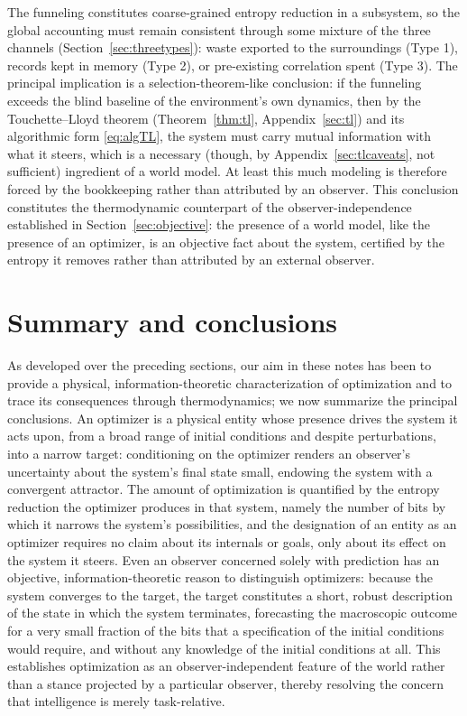 \documentclass[10pt]{article}
\theoremstyle{definition}
\theoremstyle{remark}
\begin{document}
The funneling constitutes coarse-grained entropy reduction in a subsystem, so the global accounting must remain consistent through some mixture of the three channels (Section~\ref{sec:threetypes}): waste exported to the surroundings (Type 1), records kept in memory (Type 2), or pre-existing correlation spent (Type 3). The principal implication is a selection-theorem-like conclusion: if the funneling exceeds the blind baseline of the environment's own dynamics, then by the Touchette--Lloyd theorem (Theorem~\ref{thm:tl}, Appendix~\ref{sec:tl}) and its algorithmic form \eqref{eq:algTL}, the system must carry mutual information with what it steers, which is a necessary (though, by Appendix~\ref{sec:tlcaveats}, not sufficient) ingredient of a world model. At least this much modeling is therefore forced by the bookkeeping rather than attributed by an observer. This conclusion constitutes the thermodynamic counterpart of the observer-independence established in Section~\ref{sec:objective}: the presence of a world model, like the presence of an optimizer, is an objective fact about the system, certified by the entropy it removes rather than attributed by an external observer.
\section{Summary and conclusions}
\label{sec:takeaways}

As developed over the preceding sections, our aim in these notes has been to provide a physical, information-theoretic characterization of optimization and to trace its consequences through thermodynamics; we now summarize the principal conclusions. An optimizer is a physical entity whose presence drives the system it acts upon, from a broad range of initial conditions and despite perturbations, into a narrow target: conditioning on the optimizer renders an observer's uncertainty about the system's final state small, endowing the system with a convergent attractor. The amount of optimization is quantified by the entropy reduction the optimizer produces in that system, namely the number of bits by which it narrows the system's possibilities, and the designation of an entity as an optimizer requires no claim about its internals or goals, only about its effect on the system it steers. Even an observer concerned solely with prediction has an objective, information-theoretic reason to distinguish optimizers: because the system converges to the target, the target constitutes a short, robust description of the state in which the system terminates, forecasting the macroscopic outcome for a very small fraction of the bits that a specification of the initial conditions would require, and without any knowledge of the initial conditions at all. This establishes optimization as an observer-independent feature of the world rather than a stance projected by a particular observer, thereby resolving the concern that intelligence is merely task-relative.
\end{document}
